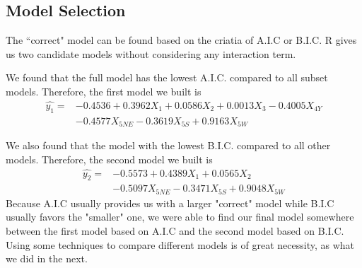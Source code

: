 \documentclass[a4paper,11pt,onecolumn,twoside]{article}
\begin{document}
\subsection{Model Selection}
The ``correct" model can be found based on the criatia of A.I.C or B.I.C. R gives us two candidate models without considering any interaction term.\par 
We found that the full model has the lowest A.I.C. compared to all subset models. Therefore, the first model we built is
\begin{equation}
\begin{split}
\hat{y_1}= &-0.4536+0.3962X_1+0.0586X_2+0.0013X_3-0.4005X_{4Y}\\ &-0.4577X_{5NE}-0.3619X_{5S}+0.9163X_{5W}
\end{split}
\end{equation} \par
We also found that the model with the lowest B.I.C. compared to all other models. Therefore, the second model we built is
\begin{equation}
\begin{split}
\hat{y_2}= &-0.5573+0.4389X_1+0.0565X_2\\&-0.5097X_{5NE}     -0.3471X_{5S}+0.9048X_{5W} 
\end{split}
\end{equation}
Because A.I.C usually provides us with a larger "correct" model while B.I.C usually favors the "smaller" one, we were able to find our final model somewhere between the first model based on A.I.C and the second model based on B.I.C. Using some techniques to compare different models is of great necessity, as what we did in the next.
\end{document}
